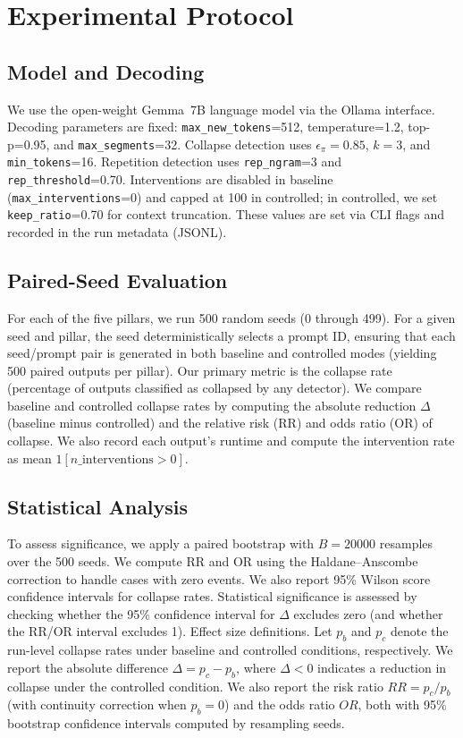 \documentclass{article}
\begin{document}
\section{Experimental Protocol}
\subsection{Model and Decoding}
We use the open-weight Gemma~7B language model via the Ollama interface. Decoding parameters are fixed: \texttt{max\_new\_tokens}=512, temperature=1.2, top-p=0.95, and \texttt{max\_segments}=32. Collapse detection uses $\epsilon_{\pi}=0.85$, $k=3$, and \texttt{min\_tokens}=16. Repetition detection uses \texttt{rep\_ngram}=3 and \texttt{rep\_threshold}=0.70. Interventions are disabled in baseline (\texttt{max\_interventions}=0) and capped at 100 in controlled; in controlled, we set \texttt{keep\_ratio}=0.70 for context truncation. These values are set via CLI flags and recorded in the run metadata (JSONL).

\subsection{Paired-Seed Evaluation}
For each of the five pillars, we run 500 random seeds (0 through 499). For a given seed and pillar, the seed deterministically selects a prompt ID, ensuring that each seed/prompt pair is generated in both baseline and controlled modes (yielding 500 paired outputs per pillar). Our primary metric is the collapse rate (percentage of outputs classified as collapsed by any detector). We compare baseline and controlled collapse rates by computing the absolute reduction $\Delta$ (baseline minus controlled) and the relative risk (RR) and odds ratio (OR) of collapse. We also record each output's runtime and compute the intervention rate as mean $1[n\_{\text{interventions}}>0]$.

\subsection{Statistical Analysis}
To assess significance, we apply a paired bootstrap with $B=20000$ resamples over the 500 seeds. We compute RR and OR using the Haldane--Anscombe correction to handle cases with zero events. We also report 95\% Wilson score confidence intervals for collapse rates. Statistical significance is assessed by checking whether the 95\% confidence interval for $\Delta$ excludes zero (and whether the RR/OR interval excludes 1).
Effect size definitions. Let $p_b$ and $p_c$ denote the run-level collapse rates under baseline and controlled conditions, respectively. We report the absolute difference $\Delta = p_c - p_b$, where $\Delta < 0$ indicates a reduction in collapse under the controlled condition. We also report the risk ratio $RR = p_c / p_b$ (with continuity correction when $p_b=0$) and the odds ratio $OR$, both with 95\% bootstrap confidence intervals computed by resampling seeds.
\end{document}
